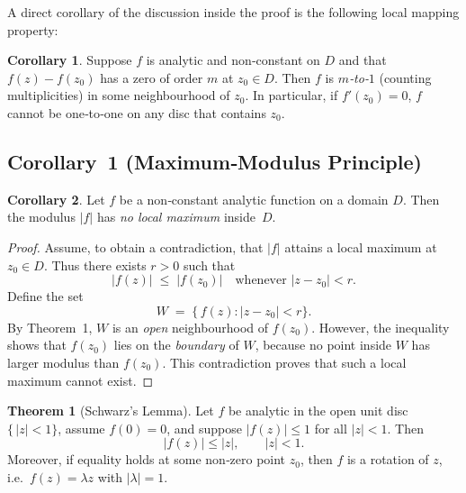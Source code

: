 \documentclass[12pt]{article}
\theoremstyle{definition} %
\newtheorem{theorem}{Theorem}
\newtheorem{corollary}{Corollary}
\theoremstyle{plain} %
\begin{document}
\medskip
A direct corollary of the discussion inside the proof is the following
local mapping property:

\begin{corollary}
Suppose $f$ is analytic and non‑constant on $D$ and that
$f(z)-f(z_0)$ has a zero of order $m$ at $z_0\in D$.
Then $f$ is \emph{$m$‑to‑$1$} (counting multiplicities) in some
neighbourhood of $z_0$.  In particular, if $f'(z_0)=0$,
$f$ cannot be one‑to‑one on any disc that contains $z_0$.
\end{corollary}

\subsection*{Corollary 1 (Maximum‑Modulus Principle)}
\begin{corollary}
Let $f$ be a non‑constant analytic function on a domain $D$.
Then the modulus $|f|$ has \emph{no local maximum} inside~$D$.
\end{corollary}

\begin{proof}
Assume, to obtain a contradiction, that $|f|$ attains a local maximum
at $z_0\in D$.  Thus there exists $r>0$ such that
\[
    |f(z)| \;\le\; |f(z_0)| \quad\text{whenever } |z-z_0|<r .
\]
Define the set
\[
    W \;=\; \bigl\{\,f(z): |z-z_0|<r \bigr\}.
\]
By Theorem 1, $W$ is an \emph{open} neighbourhood of $f(z_0)$.
However, the inequality shows that $f(z_0)$ lies on the \emph{boundary}
of $W$, because no point inside $W$ has larger modulus than $f(z_0)$.
This contradiction proves that such a local maximum cannot exist.
\end{proof}
\begin{theorem}[Schwarz's Lemma]
  Let $f$ be analytic in the open unit disc $\{\,|z|<1\}$,
  assume $f(0)=0$, and suppose $\lvert f(z)\rvert\le1$ for all $|z|<1$.
  Then
  \[
        |f(z)|\le |z|, \qquad |z|<1.
  \]
  Moreover, if equality holds at some non‑zero point $z_0$,  
  then $f$ is a rotation of $z$, i.e.\ $f(z)=\lambda z$ with $|\lambda|=1$.
  \end{theorem}
  
\end{document}
